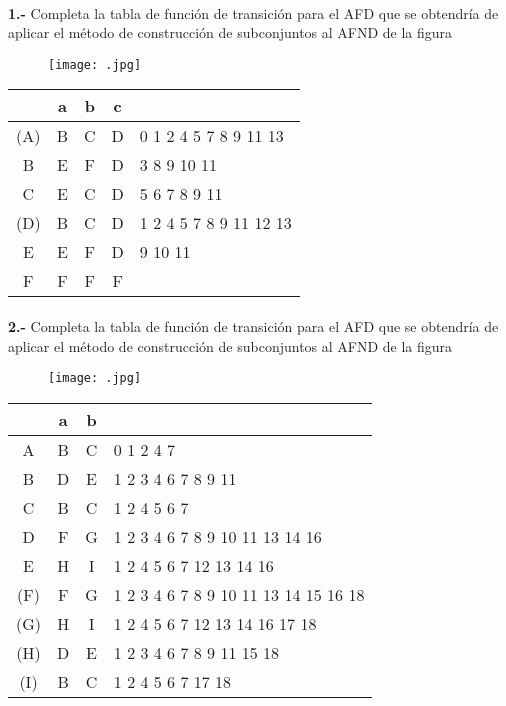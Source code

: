 \documentclass[11pt,a4paper]{report}
\begin{document}
\paragraph{}

\paragraph{}
\textbf{1.-} Completa la tabla de función de transición para el AFD que se obtendría de aplicar el método de construcción de subconjuntos al AFND de la figura
\begin{figure}[ht!]
\centering
\texttt{[image: .jpg]}
\end{figure}

\begin{tabular} {| c | c |c |c | l |}
\hline 
& a & b & c & \\ \hline
(A) & B & C & D & 0 1 2 4 5 7 8 9 11 13 \\ \hline
B & E & F & D & 3 8 9 10 11 \\ \hline
C & E & C & D & 5 6 7 8 9 11 \\ \hline
(D) & B & C & D & 1 2 4 5 7 8 9 11 12 13 \\ \hline
E & E & F & D & 9 10 11 \\ \hline
F & F & F & F & \\ \hline
\end{tabular}\paragraph{}
\textbf{2.-} Completa la tabla de función de transición para el AFD que se obtendría de aplicar el método de construcción de subconjuntos al AFND de la figura
\begin{figure}[ht!]
\centering
\texttt{[image: .jpg]}
\end{figure}

\begin{tabular} {| c | c |c | l |}
\hline 
& a & b & \\ \hline
A & B & C & 0 1 2 4 7 \\ \hline
B & D & E & 1 2 3 4 6 7 8 9 11 \\ \hline
C & B & C & 1 2 4 5 6 7 \\ \hline
D & F & G & 1 2 3 4 6 7 8 9 10 11 13 14 16 \\ \hline
E & H & I & 1 2 4 5 6 7 12 13 14 16 \\ \hline
(F) & F & G & 1 2 3 4 6 7 8 9 10 11 13 14 15 16 18 \\ \hline
(G) & H & I & 1 2 4 5 6 7 12 13 14 16 17 18 \\ \hline
(H) & D & E & 1 2 3 4 6 7 8 9 11 15 18 \\ \hline
(I) & B & C & 1 2 4 5 6 7 17 18 \\ \hline
\end{tabular}
\end{document}
